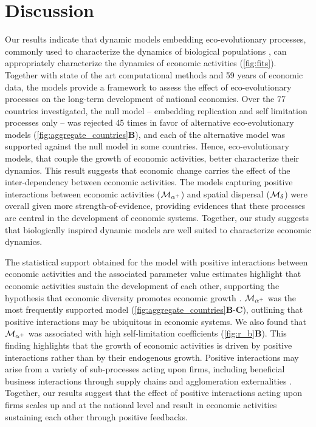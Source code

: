 \section{Discussion}

Our results indicate that dynamic models embedding eco-evolutionary processes, commonly used to characterize the dynamics of biological populations \citep{Bunin2017,Scheffer2006a,Case1990,Tilman1994b,eigen1988molecular}, can appropriately characterize the dynamics of economic activities (\cref{fig:fits}). Together with state of the art computational methods and 59 years of economic data, the models provide a framework to assess the effect of eco-evolutionary processes on the long-term development of national economies.
% 
Over the 77 countries investigated, the null model -- embedding replication and self limitation processes only -- was rejected 45 times in favor of alternative eco-evolutionary models (\cref{fig:aggregate_countries}\textbf{B}), and each of the alternative model was supported against the null model in some countries. Hence, eco-evolutionary models, that couple the growth of economic activities, better characterize their dynamics. This result suggests that economic change carries the effect of the inter-dependency between economic activities. The models capturing positive interactions between economic activities ($\mathcal{M}_{\alpha^+}$) and spatial dispersal ($\mathcal{M}_\delta$) were overall given more strength-of-evidence, providing evidences that these processes are central in the development of economic systems.  Together, our study suggests that biologically inspired dynamic models are well suited to characterize economic dynamics. 

The statistical support obtained for the model with positive interactions between economic activities and the associated parameter value estimates highlight that economic activities sustain the development of each other, supporting the hypothesis that economic diversity promotes economic growth \citep{Saviotti2020}. $\mathcal{M}_{\alpha^+}$  was the most frequently supported model (\cref{fig:aggregate_countries}\textbf{B}-\textbf{C}), outlining that positive interactions may be ubiquitous in economic systems. We also found that $\mathcal{M}_{\alpha^+}$ was associated with high self-limitation coefficients (\cref{fig:r_b}\textbf{B}). This finding highlights that the growth of economic activities is driven by positive interactions rather than by their endogenous growth. 
% 
% 
Positive interactions may arise from a variety of sub-processes acting upon firms, including beneficial business interactions through supply chains \citep{Ozman2009,Saavedra2009a} and agglomeration externalities \citep{VanDerPanne2004}. Together, our results suggest that the effect of positive interactions acting upon firms scales up and at the national level and result in economic activities sustaining each other through positive feedbacks. 

